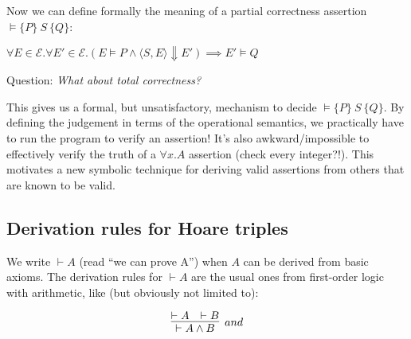 \documentclass[11pt]{article}
\begin{document}
Now we can define formally the meaning of a partial correctness assertion
$\vDash \{ P \} ~ S ~ \{ Q \}$:

\begin{center}
$\forall E \in \mathcal{E} . \forall E' \in \mathcal{E} . ( E \vDash P \wedge
\langle S, E \rangle \Downarrow E' ) \implies E' \vDash Q$
\end{center}

\noindent Question: \textit{What about total correctness?}
\iffalse
\vspace{1em}

ANSWER: 

 $ \forall E \in \mathcal{E} . E \vDash A \implies \exists E' \in \mathcal{E}
 . \langle S, E \rangle \Downarrow E' \wedge E' \vDash B$

 or even better:

 $\forall E \in \mathcal{E} \forall E' \in \mathcal{E} . ( E \vDash A \wedge
 \langle S, E \rangle \Downarrow E') \implies E' \vDash B \wedge \forall E \in
 \mathcal{E} . E \vDash A \implies \exists E' \in \mathcal{E}. \langle S, E
 \rangle \Downarrow E'$

\textbf{WORKSHEET EXAMPLES} 
\fi

This gives us a formal, but unsatisfactory, mechanism to decide $\vDash \{ P
\}~S~\{ Q \}$.  By defining the judgement in terms of the operational semantics,
we practically have to run the program to verify an assertion! It's also
awkward/impossible to effectively verify the truth of a $\forall x. A$ assertion
(check every integer?!).  This motivates a new symbolic technique for deriving
valid assertions from others that are known to be valid.

\subsection{Derivation rules for Hoare triples}

We write $\vdash A$ (read ``we can prove A'') when $A$ can be derived from basic
axioms. The derivation rules for $\vdash A$ are the usual ones from first-order
logic with arithmetic, like (but obviously not limited to):

\[
\infer[and]{\vdash A \wedge B}{\vdash A & \vdash B}
\]
\end{document}
